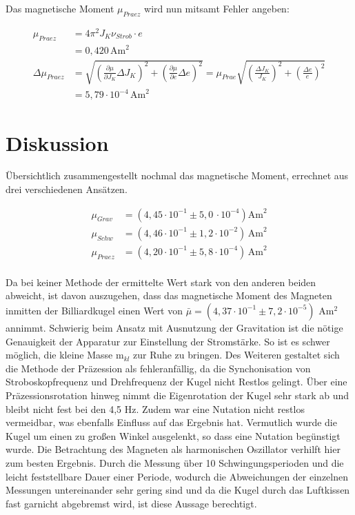 Das magnetische Moment $\mu_{Praez}$ wird nun mitsamt Fehler angeben:

\begin{align}
 \nonumber
 \mu_{Praez} &= 4\pi^2 J_K \nu_{Strob} \cdot e \\
 &= 0,420\, \text{Am}^2\\
 \nonumber
 \Delta \mu_{Praez} &= \sqrt{\left(\frac{\partial \mu}{\partial J_{K}}\Delta J_{K} \right)^2 + \left(\frac{\partial \mu}{\partial e}\Delta e \right)^2} = \mu_{Prae} \sqrt{\left( \frac{\Delta J_{K}}{J_{K}}\right)^2 + \left( \frac{\Delta e}{e}\right)^2}\\
 &= 5,79 \cdot 10^{-4}\, \text{Am}^2
\end{align}

\section{Diskussion}
Übersichtlich zusammengestellt nochmal das magnetische Moment, errechnet aus drei verschiedenen Ansätzen.

\begin{align*}
 \mu_{Grav} &= (4,45 \cdot 10^{-1} \pm 5,0\, \cdot 10^{-4}) \text{Am}^2\\
 \mu_{Schw} &= (4,46 \cdot 10^{-1} \pm 1,2 \cdot 10^{-2})\, \text{Am}^2\\
 \mu_{Praez} &= (4,20 \cdot 10^{-1} \pm 5,8 \cdot 10^{-4})\, \text{Am}^2\\
\end{align*}

Da bei keiner Methode der ermittelte Wert stark von den anderen beiden abweicht, ist davon auszugehen, dass das magnetische
Moment des Magneten inmitten der Billiardkugel einen Wert von $\bar \mu = (4,37 \cdot 10^{-1} \pm 7,2 \cdot 10^{-5})$ Am$^2$ annimmt. Schwierig beim Ansatz mit Ausnutzung der
Gravitation ist die nötige Genauigkeit der Apparatur zur Einstellung der Stromstärke. So ist es schwer möglich, die kleine Masse m$_{kl}$
zur Ruhe zu bringen. Des Weiteren gestaltet sich die Methode der Präzession als fehleranfällig, da die Synchonisation von Stroboskopfrequenz
und Drehfrequenz der Kugel nicht Restlos gelingt. Über eine Präzessionsrotation hinweg nimmt die Eigenrotation der Kugel sehr stark ab und bleibt nicht fest bei den 4,5 Hz. Zudem war eine Nutation nicht restlos vermeidbar, was ebenfalls Einfluss auf das Ergebnis hat. 
Vermutlich wurde die Kugel um einen zu großen Winkel ausgelenkt, so dass eine Nutation begünstigt wurde. Die Betrachtung des Magneten als
harmonischen Oszillator verhilft hier zum besten Ergebnis. Durch die Messung über 10 Schwingungsperioden und die leicht feststellbare Dauer
einer Periode, wodurch die Abweichungen der einzelnen Messungen untereinander sehr gering sind und da die Kugel durch das Luftkissen fast garnicht abgebremst wird,
 ist diese Aussage berechtigt.


